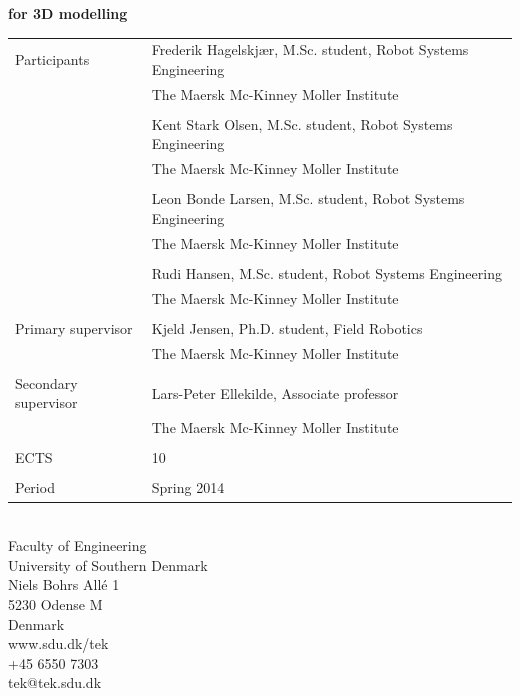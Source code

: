 \begin{titlepage}
\textsf{\Large{\textbf{\textcolor{FrontpageHeadingColor}{for 3D modelling}}}}\\
\vspace{1.0cm}
\setlength{\extrarowheight}{1.5pt}
\begin{tabular}{@{}l l}
	\textsf{\large{Participants}} & \textsf{\large{Frederik Hagelskjær, M.Sc. student, Robot Systems Engineering}}\\
	& \textsf{\large{The Maersk Mc-Kinney Moller Institute}}\\
	\\
	& \textsf{\large{Kent Stark Olsen, M.Sc. student, Robot Systems Engineering}}\\
	& \textsf{\large{The Maersk Mc-Kinney Moller Institute}}\\
	\\
	& \textsf{\large{Leon Bonde Larsen, M.Sc. student, Robot Systems Engineering}}\\
	& \textsf{\large{The Maersk Mc-Kinney Moller Institute}}\\
	\\
	& \textsf{\large{Rudi Hansen, M.Sc. student, Robot Systems Engineering}}\\
	& \textsf{\large{The Maersk Mc-Kinney Moller Institute}}\\
	\\
	\textsf{\large{Primary supervisor}} & \textsf{\large{Kjeld Jensen, Ph.D. student, Field Robotics}}\\
	& \textsf{\large{The Maersk Mc-Kinney Moller Institute}}\\
	\\
	\textsf{\large{Secondary supervisor}} & \textsf{\large{Lars-Peter Ellekilde, Associate professor}}\\
	& \textsf{\large{The Maersk Mc-Kinney Moller Institute}}\\
	\\
	\textsf{\large{ECTS}} & \textsf{\large{10}}\\
	\\
	\textsf{\large{Period}} & \textsf{\large{Spring 2014}}
\end{tabular}
\vfill
\textsf{\\Faculty of Engineering\\
University of Southern Denmark\\
Niels Bohrs Allé 1\\
5230 Odense M\\
Denmark}
\vspace*{10pt}
\\
\textsf{www.sdu.dk/tek\\
+45 6550 7303\\
tek@tek.sdu.dk}
\end{titlepage}